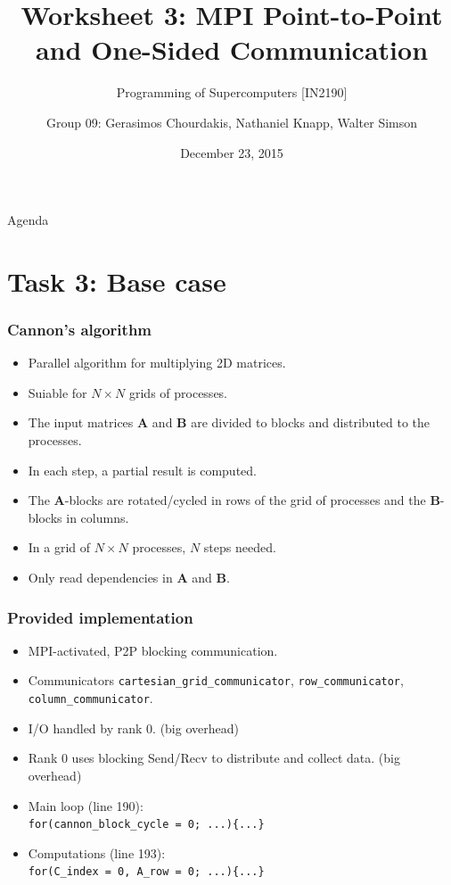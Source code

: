 \documentclass[10pt, compress]{beamer}
\title{Worksheet 3: MPI Point-to-Point and One-Sided Communication}
\subtitle{Programming of Supercomputers [IN2190]}
\date{December 23, 2015}
\author{Group 09: Gerasimos Chourdakis, Nathaniel Knapp, Walter Simson}
\institute[TUM Informatics]{Fakult\"at f\"ur Informatik - Technische Universit\"at M\"unchen}
\begin{document}
\maketitle

\begin{frame}[fragile]{Agenda}
    \tableofcontents
\end{frame}


\section{Task 3: Base case}
\begin{frame}
  \frametitle{Cannon's algorithm}
  \begin{itemize}
  \item Parallel algorithm for multiplying 2D matrices.
  \item Suiable for $N \times N$ grids of processes.
  \item The input matrices $\mathbf{A}$ and $\mathbf{B}$ are divided to blocks and distributed to the processes.
  \item In each step, a partial result is computed.
  \item The $\mathbf{A}$-blocks are rotated/cycled in rows of the grid of processes and the $\mathbf{B}$-blocks in columns.
  \item In a grid of $N \times N$ processes, $N$ steps needed.
  \item Only read dependencies in $\mathbf{A}$ and $\mathbf{B}$.
  \end{itemize}
\end{frame}

\begin{frame}
  \frametitle{Provided implementation}
  \begin{itemize}
  \item MPI-activated, P2P blocking communication.
  \item Communicators \texttt{cartesian\_grid\_communicator}, \texttt{row\_communicator}, \texttt{column\_communicator}.
  \item I/O handled by rank 0. (big overhead)
  \item Rank 0 uses blocking Send/Recv to distribute and collect data. (big overhead)
  \item Main loop (line 190): \\ 
  \texttt{for(cannon\_block\_cycle = 0; ...)\{...\} }
  \item Computations (line 193): \\ 
  \texttt{for(C\_index = 0, A\_row = 0; ...)\{...\} }
  \end{itemize}
\end{frame}
\end{document}
